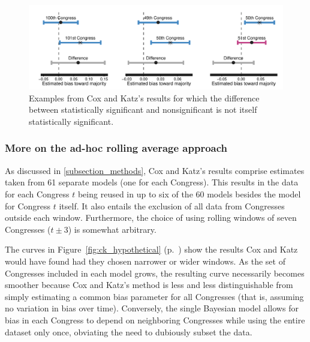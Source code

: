 \begin{figure}
\centering
\includegraphics[scale=0.75]{sections/figs/ck_signif_all}%
\caption{Examples from Cox and Katz's results for which the difference between statistically 
significant and nonsignificant is not itself statistically significant.}
\label{fig:ck_signif}
\end{figure}

\subsubsection{More on the ad-hoc rolling average approach}

As discussed in \ref{subsection_methods}, Cox and Katz's results comprise estimates taken 
from 61 separate models (one for each Congress). This results in the data for each Congress 
$t$ being reused in up to six of the 60 models besides the model for Congress $t$ itself. It also 
entails the exclusion of all data from Congresses outside each window. Furthermore, the 
choice of using rolling windows of seven Congresses ($t \pm 3$) is somewhat arbitrary. 

The curves in Figure~\ref{fig:ck_hypothetical} (p.~\pageref{fig:ck_hypothetical}) show the 
results Cox and Katz would have found had they chosen narrower or wider windows. As the 
set of Congresses included in each model grows, the resulting curve necessarily becomes 
smoother because Cox and Katz's method is less and less distinguishable from simply 
estimating a common bias parameter for all Congresses (that is, assuming no variation in 
bias over time). Conversely, the single Bayesian model allows for bias in each Congress to 
depend on neighboring Congresses while using the entire dataset only once, obviating the 
need to dubiously subset the data. 


